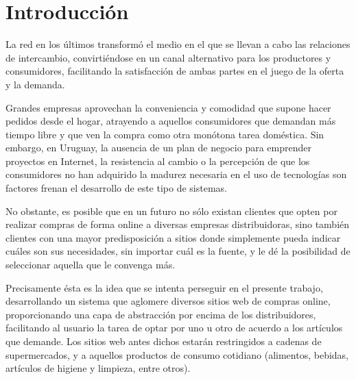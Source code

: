 \documentclass[12pt]{article} %
\begin{document}

\tableofcontents %

\newpage %


\section{Introducción} 
La red en los últimos transformó el medio en el que se llevan a cabo las relaciones de intercambio, convirtiéndose en un canal alternativo para los productores y consumidores, facilitando la satisfacción de ambas partes en el juego de la oferta y la demanda.

Grandes empresas aprovechan la conveniencia y comodidad que supone hacer pedidos desde el hogar, atrayendo a aquellos consumidores que demandan más tiempo libre y que ven la compra como otra monótona tarea doméstica. Sin embargo, en Uruguay, la ausencia de un plan de negocio para emprender proyectos en Internet, la resistencia al cambio o la percepción de que los consumidores no han adquirido la madurez necesaria en el uso de tecnologías son factores frenan el desarrollo de este tipo de sistemas. 

No obstante, es posible que en un futuro no sólo existan clientes que opten por realizar compras de forma online a diversas empresas distribuidoras, sino también clientes con una mayor predisposición a sitios donde simplemente pueda indicar cuáles son sus necesidades, sin importar cuál es la fuente, y le dé la posibilidad de seleccionar aquella que le convenga más. 

Precisamente ésta es la idea que se intenta perseguir en el presente trabajo, desarrollando un sistema que aglomere diversos sitios web de compras online, proporcionando una capa de abstracción por encima de los distribuidores, facilitando al usuario la tarea de optar por uno u otro de acuerdo a los artículos que demande. Los sitios web antes dichos estarán restringidos a cadenas de supermercados, y a aquellos productos de consumo cotidiano (alimentos, bebidas, artículos de higiene y limpieza, entre otros).
\end{document}
